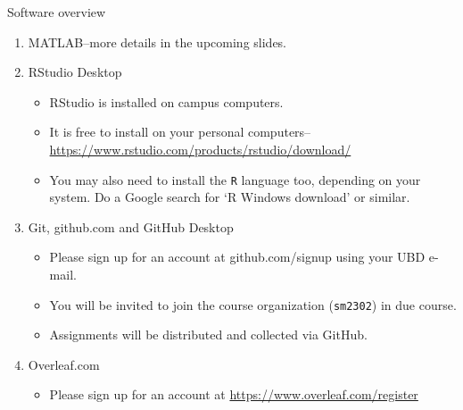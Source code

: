 \documentclass[,aspectratio=169]{beamer}
\providecommand{\tightlist}{%
  \setlength{\itemsep}{0pt}\setlength{\parskip}{0pt}}
\newcommand{\bs}{{\bm s}}
\begin{document}
\begin{frame}[fragile]{Software overview}
\begin{enumerate}
\item
  MATLAB--more details in the upcoming slides.
\item
  RStudio Desktop

  \begin{itemize}
  \tightlist
  \item
    RStudio is installed on campus computers.
  \item
    It is free to install on your personal
    computers--\url{https://www.rstudio.com/products/rstudio/download/}
  \item
    You may also need to install the \texttt{R} language too, depending
    on your system. Do a Google search for `R Windows download' or
    similar.
  \end{itemize}
\item
  Git, github.com and GitHub Desktop

  \begin{itemize}
  \tightlist
  \item
    Please sign up for an account at github.com/signup using your UBD
    e-mail.
  \item
    You will be invited to join the course organization
    (\texttt{sm2302}) in due course.
  \item
    Assignments will be distributed and collected via GitHub.
  \end{itemize}
\item
  Overleaf.com

  \begin{itemize}
  \tightlist
  \item
    Please sign up for an account at
    \url{https://www.overleaf.com/register}
  \end{itemize}
\end{enumerate}
\end{frame}



\renewcommand{\bs}[1]{\boldsymbol{#1}}
\newcommand{\mb}[1]{\mathbf{#1}} 
\newcommand{\mc}[1]{\mathcal{#1}} 
\newcommand{\mbb}[1]{\mathbb{#1}} 
\newcommand{\txt}[1]{\texttt{#1}} 
\newcommand{\pdiff}[3]{ \if 1#1 
	\frac{\partial #2}{\partial #3} \else \frac{\partial^{#1} #2}{\partial 
		#3^{#1}}\fi}
\newcommand{\ppdiff}[3]{\frac{\partial^2 #1}{\partial #2 \partial #3}}
\newcommand{\sdiff}[3]{ \if 1#1 \frac{d #2}{d #3} \else \frac{d^{#1} #2}{d 
		#3^{#1}}\fi}
\newcommand{\e}{\mbox{e}}
\newcommand{\rvec}[1]{\overrightarrow{#1}}
\newcommand{\uvec}[3]{#1\,\mb{i}~ #2\,\mb{j}~ #3\,\mb{k}}
\end{document}
